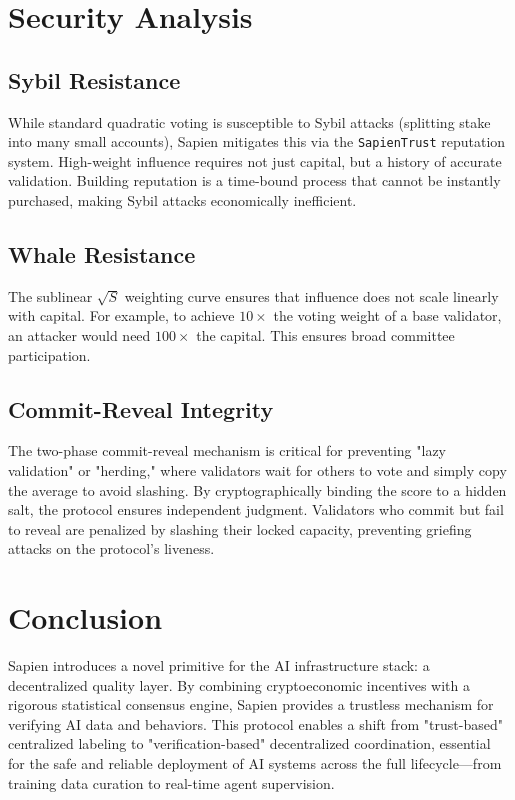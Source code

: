 \documentclass[11pt, a4paper]{article}
\begin{document}
\section{Security Analysis}

\subsection{Sybil Resistance}
While standard quadratic voting is susceptible to Sybil attacks (splitting stake into many small accounts), Sapien mitigates this via the \texttt{SapienTrust} reputation system. High-weight influence requires not just capital, but a history of accurate validation. Building reputation is a time-bound process that cannot be instantly purchased, making Sybil attacks economically inefficient.

\subsection{Whale Resistance}
The sublinear $\sqrt{S}$ weighting curve ensures that influence does not scale linearly with capital. For example, to achieve $10\times$ the voting weight of a base validator, an attacker would need $100\times$ the capital. This ensures broad committee participation.

\subsection{Commit-Reveal Integrity}
The two-phase commit-reveal mechanism is critical for preventing "lazy validation" or "herding," where validators wait for others to vote and simply copy the average to avoid slashing. By cryptographically binding the score to a hidden salt, the protocol ensures independent judgment. Validators who commit but fail to reveal are penalized by slashing their locked capacity, preventing griefing attacks on the protocol's liveness.

\section{Conclusion}

Sapien introduces a novel primitive for the AI infrastructure stack: a decentralized quality layer. By combining cryptoeconomic incentives with a rigorous statistical consensus engine, Sapien provides a trustless mechanism for verifying AI data and behaviors. This protocol enables a shift from "trust-based" centralized labeling to "verification-based" decentralized coordination, essential for the safe and reliable deployment of AI systems across the full lifecycle—from training data curation to real-time agent supervision.
\end{document}
